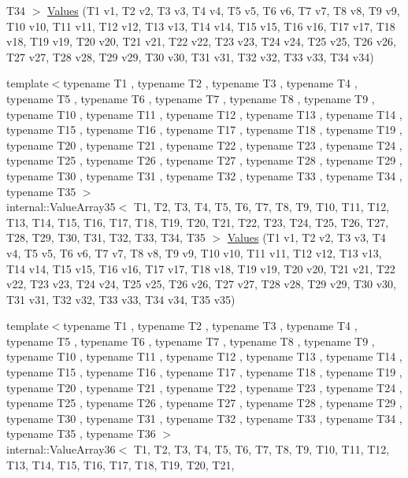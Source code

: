 \begin{DoxyCompactItemize}
\-T34 $>$ \hyperlink{namespacetesting_a37ae9a0b15ed1e02fda22769ef76c97e}{\-Values} (\-T1 v1, \-T2 v2, \-T3 v3, \-T4 v4, \-T5 v5, \-T6 v6, \-T7 v7, \-T8 v8, \-T9 v9, \-T10 v10, \-T11 v11, \-T12 v12, \-T13 v13, \-T14 v14, \-T15 v15, \-T16 v16, \-T17 v17, \-T18 v18, \-T19 v19, \-T20 v20, \-T21 v21, \-T22 v22, \-T23 v23, \-T24 v24, \-T25 v25, \-T26 v26, \-T27 v27, \-T28 v28, \-T29 v29, \-T30 v30, \-T31 v31, \-T32 v32, \-T33 v33, \-T34 v34)
\item 
{\footnotesize template$<$typename T1 , typename T2 , typename T3 , typename T4 , typename T5 , typename T6 , typename T7 , typename T8 , typename T9 , typename T10 , typename T11 , typename T12 , typename T13 , typename T14 , typename T15 , typename T16 , typename T17 , typename T18 , typename T19 , typename T20 , typename T21 , typename T22 , typename T23 , typename T24 , typename T25 , typename T26 , typename T27 , typename T28 , typename T29 , typename T30 , typename T31 , typename T32 , typename T33 , typename T34 , typename T35 $>$ }\\internal\-::\-Value\-Array35$<$ \-T1, \-T2, \*
\-T3, \-T4, \-T5, \-T6, \-T7, \-T8, \-T9, \*
\-T10, \-T11, \-T12, \-T13, \-T14, \-T15, \*
\-T16, \-T17, \-T18, \-T19, \-T20, \-T21, \*
\-T22, \-T23, \-T24, \-T25, \-T26, \-T27, \*
\-T28, \-T29, \-T30, \-T31, \-T32, \-T33, \*
\-T34, \-T35 $>$ \hyperlink{namespacetesting_a8746425c9d27e46ea5bc5fd77586bc2a}{\-Values} (\-T1 v1, \-T2 v2, \-T3 v3, \-T4 v4, \-T5 v5, \-T6 v6, \-T7 v7, \-T8 v8, \-T9 v9, \-T10 v10, \-T11 v11, \-T12 v12, \-T13 v13, \-T14 v14, \-T15 v15, \-T16 v16, \-T17 v17, \-T18 v18, \-T19 v19, \-T20 v20, \-T21 v21, \-T22 v22, \-T23 v23, \-T24 v24, \-T25 v25, \-T26 v26, \-T27 v27, \-T28 v28, \-T29 v29, \-T30 v30, \-T31 v31, \-T32 v32, \-T33 v33, \-T34 v34, \-T35 v35)
\item 
{\footnotesize template$<$typename T1 , typename T2 , typename T3 , typename T4 , typename T5 , typename T6 , typename T7 , typename T8 , typename T9 , typename T10 , typename T11 , typename T12 , typename T13 , typename T14 , typename T15 , typename T16 , typename T17 , typename T18 , typename T19 , typename T20 , typename T21 , typename T22 , typename T23 , typename T24 , typename T25 , typename T26 , typename T27 , typename T28 , typename T29 , typename T30 , typename T31 , typename T32 , typename T33 , typename T34 , typename T35 , typename T36 $>$ }\\internal\-::\-Value\-Array36$<$ \-T1, \-T2, \*
\-T3, \-T4, \-T5, \-T6, \-T7, \-T8, \-T9, \*
\-T10, \-T11, \-T12, \-T13, \-T14, \-T15, \*
\-T16, \-T17, \-T18, \-T19, \-T20, \-T21, \*

\end{DoxyCompactItemize}
